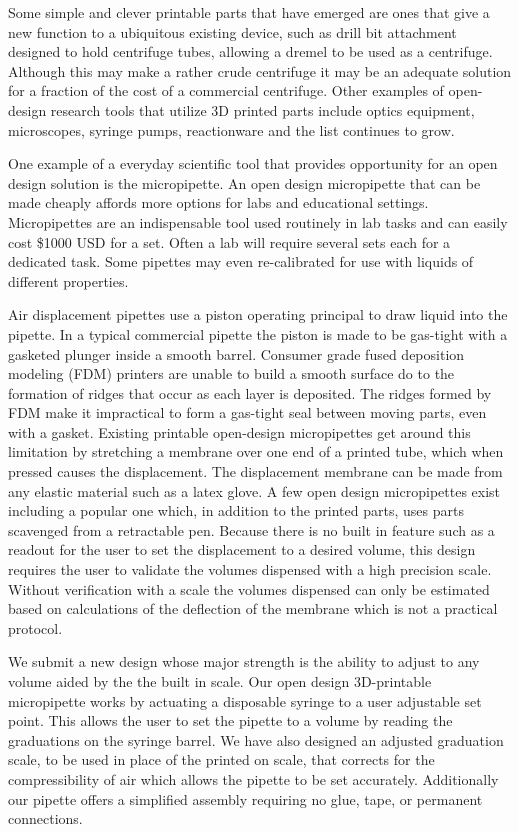 \documentclass[10pt,letterpaper]{article}
\begin{document}
Some simple and clever printable parts that have emerged are ones that give a new function to a ubiquitous existing device, such as drill bit attachment designed to hold centrifuge tubes, allowing a dremel to be used as a centrifuge\cite{Garvey2009}.
Although this may make a rather crude centrifuge it may be an adequate solution for a fraction of the cost of a commercial centrifuge.
Other examples of open-design research tools that utilize 3D printed parts include optics equipment\cite{Zhang2013}, microscopes\cite{Baden2014a,Walus2014}, syringe pumps\cite{Wijnen2014}, reactionware\cite{Symes2012} and the list continues to grow.

One example of a everyday scientific tool that provides opportunity for an open design solution is the micropipette.
An open design micropipette that can be made cheaply affords more options for labs and educational settings.
Micropipettes are an indispensable tool used routinely in lab tasks and can easily cost \$1000 USD for a set.
Often a lab will require several sets each for a dedicated task.
Some pipettes may even re-calibrated for use with liquids of different properties.

Air displacement pipettes use a piston operating principal to draw liquid into the pipette\cite{ISO8655}.
In a typical commercial pipette the piston is made to be gas-tight with a gasketed plunger inside a smooth barrel.
Consumer grade fused deposition modeling (FDM) printers are unable to build a smooth surface do to the formation of ridges that occur as each layer is deposited.
The ridges formed by FDM make it impractical to form a gas-tight seal between moving parts, even with a gasket.
Existing printable open-design micropipettes get around this limitation by stretching a membrane over one end of a printed tube, which when pressed causes the displacement.
The displacement membrane can be made from any elastic material such as a latex glove.
A few open design micropipettes exist including a popular one which, in addition to the printed parts, uses parts scavenged from a retractable pen\cite{Baden2014}.
Because there is no built in feature such as a readout for the user to set the displacement to a desired volume, this design requires the user to validate the volumes dispensed with a high precision scale.
Without verification with a scale the volumes dispensed can only be estimated based on calculations of the deflection of the membrane which is not a practical protocol.

We submit a new design whose major strength is the ability to adjust to any volume aided by the the built in scale.
Our open design 3D-printable micropipette works by actuating a disposable syringe to a user adjustable set point.
This allows the user to set the pipette to a volume by reading the graduations on the syringe barrel.
We have also designed an adjusted graduation scale, to be used in place of the printed on scale, that corrects for the compressibility of air which allows the pipette to be set accurately.
Additionally our pipette offers a simplified assembly requiring no glue, tape, or permanent connections.
\end{document}
